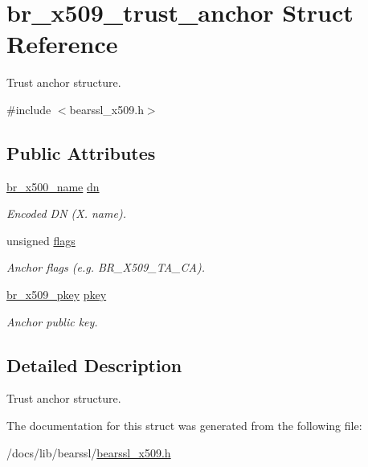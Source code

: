 \hypertarget{structbr__x509__trust__anchor}{}\section{br\+\_\+x509\+\_\+trust\+\_\+anchor Struct Reference}
\label{structbr__x509__trust__anchor}


Trust anchor structure.  




{\ttfamily \#include $<$bearssl\+\_\+x509.\+h$>$}

\subsection*{Public Attributes}
\begin{DoxyCompactItemize}
\item 
\mbox{\label{structbr__x509__trust__anchor_aa2443241c80366d647110a92f27b04a9}} 
\hyperlink{structbr__x500__name}{br\+\_\+x500\+\_\+name} \hyperlink{structbr__x509__trust__anchor_aa2443241c80366d647110a92f27b04a9}{dn}
\begin{DoxyCompactList}\small\item\em Encoded DN (X. name). \end{DoxyCompactList}\item 
\mbox{\label{structbr__x509__trust__anchor_a71b8c4a0218e48d7faa711952d32b0e1}} 
unsigned \hyperlink{structbr__x509__trust__anchor_a71b8c4a0218e48d7faa711952d32b0e1}{flags}
\begin{DoxyCompactList}\small\item\em Anchor flags (e.\+g. {\ttfamily B\+R\+\_\+\+X509\+\_\+\+T\+A\+\_\+\+CA}). \end{DoxyCompactList}\item 
\mbox{\label{structbr__x509__trust__anchor_a7eb4fab6abb7b3e2cb7b46799d8d8db6}} 
\hyperlink{structbr__x509__pkey}{br\+\_\+x509\+\_\+pkey} \hyperlink{structbr__x509__trust__anchor_a7eb4fab6abb7b3e2cb7b46799d8d8db6}{pkey}
\begin{DoxyCompactList}\small\item\em Anchor public key. \end{DoxyCompactList}\end{DoxyCompactItemize}


\subsection{Detailed Description}
Trust anchor structure. 

The documentation for this struct was generated from the following file\+:\begin{DoxyCompactItemize}
\item 
/docs/lib/bearssl/\hyperlink{bearssl__x509_8h}{bearssl\+\_\+x509.\+h}\end{DoxyCompactItemize}
